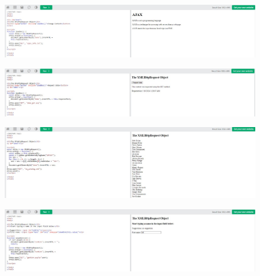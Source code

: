 \documentclass{article}
\begin{document}
\begin{itemize}
\begin{figure}[H]
		\end{figure}
		\begin{figure}[H]
			\centering
			\includegraphics[width=1.0\textwidth,keepaspectratio]{img/w13.jpg}
		\end{figure}
		\begin{figure}[H]
			\centering
			\includegraphics[width=1.0\textwidth,keepaspectratio]{img/w14.jpg}
		\end{figure}
		\begin{figure}[H]
			\centering
			\includegraphics[width=1.0\textwidth,keepaspectratio]{img/w15.jpg}
		\end{figure}
		\begin{figure}[H]
			\centering
			\includegraphics[width=1.0\textwidth,keepaspectratio]{img/w16.jpg}

\end{figure}
\end{itemize}
\end{document}
